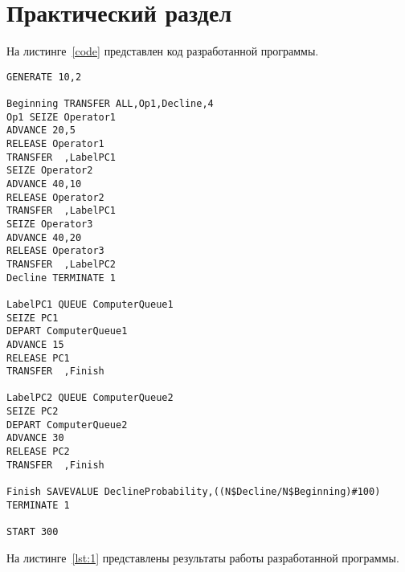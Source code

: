 \chapter{Практический раздел}

На листинге~\ref{code} представлен код разработанной программы.

\begin{lstlisting}[label=code,caption=Код разработанной программы]
GENERATE 10,2

Beginning TRANSFER ALL,Op1,Decline,4
Op1 SEIZE Operator1
ADVANCE 20,5
RELEASE Operator1
TRANSFER  ,LabelPC1
SEIZE Operator2
ADVANCE 40,10
RELEASE Operator2
TRANSFER  ,LabelPC1
SEIZE Operator3
ADVANCE 40,20
RELEASE Operator3
TRANSFER  ,LabelPC2
Decline TERMINATE 1

LabelPC1 QUEUE ComputerQueue1
SEIZE PC1
DEPART ComputerQueue1
ADVANCE 15
RELEASE PC1
TRANSFER  ,Finish

LabelPC2 QUEUE ComputerQueue2
SEIZE PC2
DEPART ComputerQueue2
ADVANCE 30
RELEASE PC2
TRANSFER  ,Finish

Finish SAVEVALUE DeclineProbability,((N$Decline/N$Beginning)#100)
TERMINATE 1

START 300
\end{lstlisting}

На листинге~\ref{lst:1} представлены результаты работы разработанной программы.

